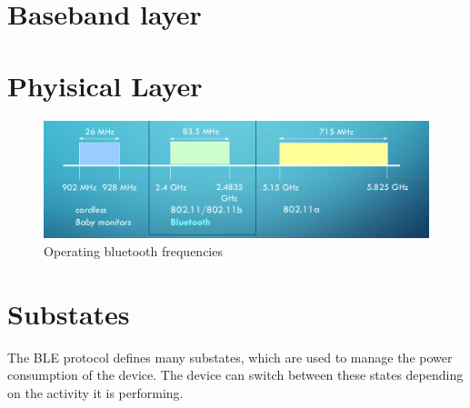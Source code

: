 \newpage
\section{Baseband layer}
\section{Phyisical Layer}
\begin{figure}[htbp]
   \centering
   \includegraphics{images/bluetooth_frequencies.png}
   \caption{Operating bluetooth frequencies}
   \label{fig:bluetooth_frequencies}
\end{figure}

\section{Substates}
The BLE protocol defines many substates, which are used to manage the power consumption of the device. The device can switch between these states depending on the activity it is performing.


